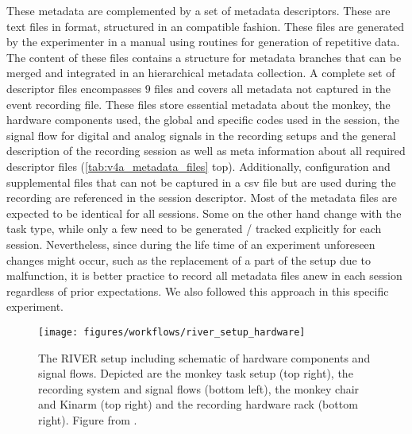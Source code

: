 These metadata are complemented by a set of metadata descriptors. These are text files in  format, structured in an  compatible fashion. These files are generated by the experimenter in a manual using  routines for generation of repetitive data. The content of these files contains a structure for metadata branches that can be merged and integrated in an hierarchical  metadata collection. A complete set of descriptor files encompasses $9$  files and covers all metadata not captured in the event recording file. These  files store essential metadata about the monkey, the hardware components used, the global and specific codes used in the session, the signal flow for digital and analog signals in the recording setups and the general description of the recording session as well as meta information about all required descriptor files (\cref{tab:v4a_metadata_files} top). Additionally, configuration and supplemental files that can not be captured in a csv file but are used during the recording are referenced in the session descriptor. Most of the metadata files are expected to be identical for all sessions. Some on the other hand change with the task type, while only a few need to be generated / tracked explicitly for each session. Nevertheless, since during the life time of an experiment unforeseen changes might occur, such as the replacement of a part of the setup due to malfunction, it is better practice to record all metadata files anew in each session regardless of prior expectations. We also followed this approach in this specific experiment.



\begin{sidewaysfigure}
 \texttt{[image: figures/workflows/river\_setup\_hardware]}
 \caption[The RIVER setup]{The RIVER setup including schematic of hardware components and signal flows. Depicted are the monkey task setup (top right), the recording system and signal flows (bottom left), the monkey chair and Kinarm (top right) and the recording hardware rack (bottom right). Figure from \citet{deHaan_2018a}.}
 \label{fig:river_setup}
\end{sidewaysfigure}


